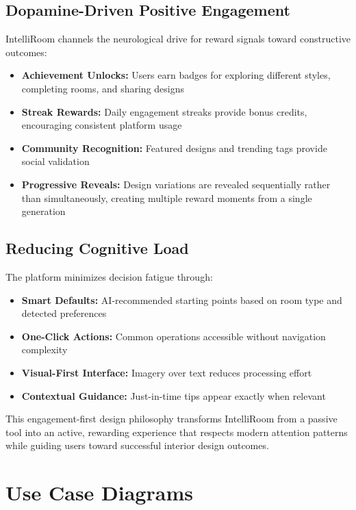 \subsection{Dopamine-Driven Positive Engagement}

IntelliRoom channels the neurological drive for reward signals toward constructive outcomes:

\begin{itemize}
    \item \textbf{Achievement Unlocks:} Users earn badges for exploring different styles, completing rooms, and sharing designs
    \item \textbf{Streak Rewards:} Daily engagement streaks provide bonus credits, encouraging consistent platform usage
    \item \textbf{Community Recognition:} Featured designs and trending tags provide social validation
    \item \textbf{Progressive Reveals:} Design variations are revealed sequentially rather than simultaneously, creating multiple reward moments from a single generation
\end{itemize}

\subsection{Reducing Cognitive Load}

The platform minimizes decision fatigue through:

\begin{itemize}
    \item \textbf{Smart Defaults:} AI-recommended starting points based on room type and detected preferences
    \item \textbf{One-Click Actions:} Common operations accessible without navigation complexity
    \item \textbf{Visual-First Interface:} Imagery over text reduces processing effort
    \item \textbf{Contextual Guidance:} Just-in-time tips appear exactly when relevant
\end{itemize}

This engagement-first design philosophy transforms IntelliRoom from a passive tool into an active, rewarding experience that respects modern attention patterns while guiding users toward successful interior design outcomes.

\section{Use Case Diagrams}
\label{sec:use_cases}

